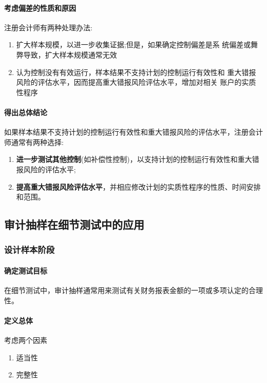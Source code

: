 \documentclass[UTF8,12pt]{ctexart}
\numberwithin{equation}{section} %
\numberwithin{figure}{section}
\numberwithin{table}{section}
\begin{document}
	\paragraph{考虑偏差的性质和原因}
	注册会计师有两种处理办法: 
	\begin{enumerate}
		\item 扩大样本规模，以进一步收集证据;但是，如果确定控制偏差是系 统偏差或舞弊导致，扩大样本规模通常无效
		
		\item 认为控制没有有效运行，样本结果不支持计划的控制运行有效性和 重大错报风险的评估水平，因而提高重大错报风险评估水平，增加对相关 账户的实质性程序
	\end{enumerate}
	
	\paragraph{得出总体结论}
	如果样本结果不支持计划的控制运行有效性和重大错报风险的评估水平，注册会计师通常有两种选择:
	\begin{enumerate}
		\item \textbf{进一步测试其他控制}(如补偿性控制)，以支持计划的控制运行有效性和重大错报风险的评估水平;
		
		\item \textbf{提高重大错报风险评估水平}，并相应修改计划的实质性程序的性质、时间安排和范围。
	\end{enumerate}
	
	
	
	\subsection{审计抽样在细节测试中的应用}
	
	\subsubsection{设计样本阶段}
	\paragraph{确定测试目标} 在细节测试中，审计抽样通常用来测试有关财务报表金额的一项或多项认定的合理性。
	
	\paragraph{定义总体} 考虑两个因素
	\begin{enumerate}
		\item 适当性
		
		\item 完整性
	\end{enumerate}
	
\end{document}
